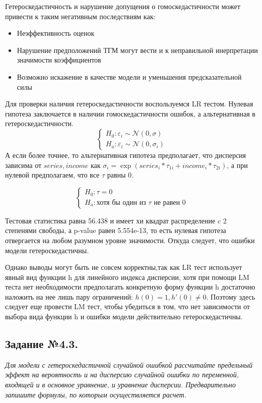 \documentclass[a4paper,12pt]{article}
\begin{document}
	Гетероскедастичность и нарушение допущения о гомоскедастичности может привести к таким негативным последствиям как:
	\begin{itemize}
		\item Неэффективность оценок
		\item Нарушение предположений ТГМ могут вести и к неправильной инерпретации значимости коэффициентов
		\item Возможно искажение в качестве модели и уменьшения предсказательной силы
	\end{itemize}

	Для проверки наличия гетероскедастичности воспользуемся LR тестом. Нулевая гипотеза заключается в наличии гомоскедастичности ошибок, а альтернативная в гетероскедастичности. 
		\begin{equation*}
		\begin{cases}
			H_0: \varepsilon_i \sim \mathcal{N} (0, \sigma)\\
			H_a: \varepsilon_i \sim \mathcal{N} (0, \sigma_i)
		\end{cases}
	\end{equation*}
	А если более точнее, то альтернативная гипотеза предполагает, что дисперсия зависима от $series, income$ как $\sigma_i=\exp(series_i* \tau_{1i}+ income_i* \tau_{2i})$, а при нулевой предполагаем, что все $\tau$ равны 0.
	
	\begin{equation*}
		\begin{cases}
			H_0: \tau = 0\\
			H_a: \text{хотя бы один из $\tau$ не равен 0}
		\end{cases}
	\end{equation*}

	Тестовая статистика равна 56.438 и имеет хи квадрат распределение c 2 степенями свободы, а p-value равен 5.554e-13, то есть нулевая гипотеза отвергается на любом разумном уровне значимости. Откуда следует, что ошибки модели гетероскедастичны.
	
	Однако выводы могут быть не совсем корректны,так как LR тест использует явный вид функции h для линейного индекса дисперсии, хотя при помощи LM теста нет необходимости предполагать конкретную форму функции h достаточно наложить на нее лишь пару ограничений: $ h(0) = 1, h'(0) \ne 0$. Поэтому здесь следует еще провести LM тест, чтобы убедиться в том, что нет зависимости от выбора вида функции h и ошибки модели действительно гетероскедастичны.
		
	\subsection{Задание №4.3.}
	\textit{
	Для модели с гетероскедастичной случайной ошибкой рассчитайте предельный эффект на вероятность и на дисперсию случайной ошибки по переменной, входящей и в основное уравнение, и уравнение дисперсии. Предварительно запишите формулы, по которым осуществляется расчет. }
	
\end{document}
